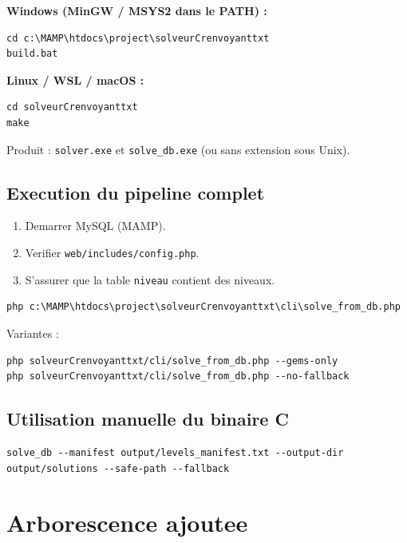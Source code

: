 \documentclass[11pt,a4paper]{article}
\begin{document}
\textbf{Windows (MinGW / MSYS2 dans le PATH) :}
\begin{lstlisting}[style=kllisting]
cd c:\MAMP\htdocs\project\solveurCrenvoyanttxt
build.bat
\end{lstlisting}

\textbf{Linux / WSL / macOS :}
\begin{lstlisting}[style=kllisting]
cd solveurCrenvoyanttxt
make
\end{lstlisting}

Produit : \texttt{solver.exe} et \texttt{solve\_db.exe} (ou sans extension sous Unix).

\subsection{Execution du pipeline complet}

\begin{enumerate}
    \item Demarrer MySQL (MAMP).
    \item Verifier \texttt{web/includes/config.php}.
    \item S'assurer que la table \texttt{niveau} contient des niveaux.
\end{enumerate}

\begin{lstlisting}[style=kllisting]
php c:\MAMP\htdocs\project\solveurCrenvoyanttxt\cli\solve_from_db.php
\end{lstlisting}

Variantes :
\begin{lstlisting}[style=kllisting]
php solveurCrenvoyanttxt/cli/solve_from_db.php --gems-only
php solveurCrenvoyanttxt/cli/solve_from_db.php --no-fallback
\end{lstlisting}

\subsection{Utilisation manuelle du binaire C}

\begin{lstlisting}[style=kllisting]
solve_db --manifest output/levels_manifest.txt --output-dir output/solutions --safe-path --fallback
\end{lstlisting}

\section{Arborescence ajoutee}
\end{document}
